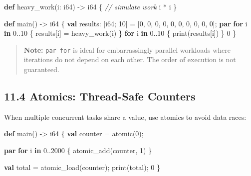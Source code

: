 \documentclass[
  english,
]{book}
\newenvironment{Shaded}{\begin{snugshade}}{\end{snugshade}}
\newcommand{\CommentTok}[1]{\textcolor[rgb]{0.42,0.60,0.33}{\textit{#1}}}
\newcommand{\ControlFlowTok}[1]{\textcolor[rgb]{0.77,0.53,0.75}{\textbf{#1}}}
\newcommand{\DataTypeTok}[1]{\textcolor[rgb]{0.31,0.79,0.69}{#1}}
\newcommand{\DecValTok}[1]{\textcolor[rgb]{0.71,0.81,0.66}{#1}}
\newcommand{\FunctionTok}[1]{\textcolor[rgb]{0.86,0.86,0.67}{#1}}
\newcommand{\KeywordTok}[1]{\textcolor[rgb]{0.34,0.61,0.84}{\textbf{#1}}}
\newcommand{\NormalTok}[1]{\textcolor[rgb]{0.83,0.83,0.83}{#1}}
\newcommand{\OperatorTok}[1]{\textcolor[rgb]{0.83,0.83,0.83}{#1}}
\begin{document}
\begin{Shaded}
\begin{Highlighting}[]
\KeywordTok{def}\NormalTok{ heavy\_work(i: }\DataTypeTok{i64}\NormalTok{) }\OperatorTok{{-}\textgreater{}} \DataTypeTok{i64}\NormalTok{ \{}
    \CommentTok{// simulate work}
\NormalTok{    i }\OperatorTok{*}\NormalTok{ i}
\NormalTok{\}}

\KeywordTok{def}\NormalTok{ main() }\OperatorTok{{-}\textgreater{}} \DataTypeTok{i64}\NormalTok{ \{}
    \KeywordTok{val}\NormalTok{ results: [}\DataTypeTok{i64}\NormalTok{; }\DecValTok{10}\NormalTok{] }\OperatorTok{=}\NormalTok{ [}\DecValTok{0}\NormalTok{, }\DecValTok{0}\NormalTok{, }\DecValTok{0}\NormalTok{, }\DecValTok{0}\NormalTok{, }\DecValTok{0}\NormalTok{, }\DecValTok{0}\NormalTok{, }\DecValTok{0}\NormalTok{, }\DecValTok{0}\NormalTok{, }\DecValTok{0}\NormalTok{, }\DecValTok{0}\NormalTok{];}
    \KeywordTok{par} \ControlFlowTok{for}\NormalTok{ i }\ControlFlowTok{in} \DecValTok{0}\OperatorTok{..}\DecValTok{10}\NormalTok{ \{}
\NormalTok{        results[i] }\OperatorTok{=}\NormalTok{ heavy\_work(i)}
\NormalTok{    \}}
    \ControlFlowTok{for}\NormalTok{ i }\ControlFlowTok{in} \DecValTok{0}\OperatorTok{..}\DecValTok{10}\NormalTok{ \{}
        \FunctionTok{print}\NormalTok{(results[i])}
\NormalTok{    \}}
    \DecValTok{0}
\NormalTok{\}}
\end{Highlighting}
\end{Shaded}

\begin{quote}
\textbf{Note:} \texttt{par\ for} is ideal for embarrassingly parallel
workloads where iterations do not depend on each other. The order of
execution is not guaranteed.
\end{quote}

\subsection{11.4 Atomics: Thread-Safe
Counters}\label{atomics-thread-safe-counters}

When multiple concurrent tasks share a value, use atomics to avoid data
races:

\begin{Shaded}
\begin{Highlighting}[]
\KeywordTok{def}\NormalTok{ main() }\OperatorTok{{-}\textgreater{}} \DataTypeTok{i64}\NormalTok{ \{}
    \KeywordTok{val}\NormalTok{ counter }\OperatorTok{=} \DataTypeTok{atomic}\NormalTok{(}\DecValTok{0}\NormalTok{);}

    \KeywordTok{par} \ControlFlowTok{for}\NormalTok{ i }\ControlFlowTok{in} \DecValTok{0}\OperatorTok{..}\DecValTok{2000}\NormalTok{ \{}
        \FunctionTok{atomic\_add}\NormalTok{(counter, }\DecValTok{1}\NormalTok{)}
\NormalTok{    \}}

    \KeywordTok{val}\NormalTok{ total }\OperatorTok{=} \FunctionTok{atomic\_load}\NormalTok{(counter);}
    \FunctionTok{print}\NormalTok{(total);}
    \DecValTok{0}
\NormalTok{\}}
\end{Highlighting}
\end{Shaded}
\end{document}
